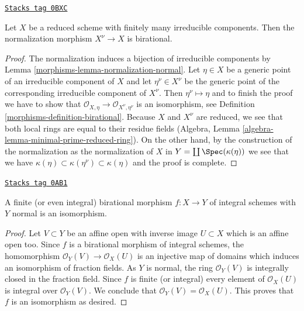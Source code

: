 \begin{lemma}
\label{morphisms-lemma-normalization-birational}
\href{https://stacks.math.columbia.edu/tag/0BXC}{\texttt{Stacks tag 0BXC}}

Let $X$ be a reduced scheme with finitely many irreducible components.
Then the normalization morphism $X^\nu \to X$ is birational.
\end{lemma}

\begin{proof}

The normalization induces a bijection of irreducible components by
Lemma \ref{morphisms-lemma-normalization-normal}. Let $\eta \in X$ be a generic
point of an irreducible component of $X$ and let $\eta^\nu \in X^\nu$
be the generic point of the corresponding irreducible component of $X^\nu$.
Then $\eta^\nu \mapsto \eta$ and to finish the proof we have to show that
$\mathcal{O}_{X, \eta} \to \mathcal{O}_{X^\nu, \eta^\nu}$
is an isomorphism, see Definition \ref{morphisms-definition-birational}.
Because $X$ and $X^\nu$ are reduced, we see that both local rings
are equal to their residue fields
(Algebra, Lemma \ref{algebra-lemma-minimal-prime-reduced-ring}).
On the other hand, by the construction of the normalization
as the normalization of $X$ in $Y = \coprod \Spec(\kappa(\eta))$
we see that we have
$\kappa(\eta) \subset \kappa(\eta^\nu) \subset \kappa(\eta)$
and the proof is complete.
\end{proof}

\begin{lemma}
\label{morphisms-lemma-finite-birational-over-normal}
\href{https://stacks.math.columbia.edu/tag/0AB1}{\texttt{Stacks tag 0AB1}}

A finite (or even integral) birational morphism $f : X \to Y$
of integral schemes with $Y$ normal is an isomorphism.
\end{lemma}

\begin{proof}
Let $V \subset Y$ be an affine open
with inverse image $U \subset X$ which is an affine open too.
Since $f$ is a birational morphism of integral schemes, the homomorphism
$\mathcal{O}_Y(V) \to \mathcal{O}_X(U)$ is an injective map of domains
which induces an isomorphism of fraction fields. As $Y$ is normal,
the ring $\mathcal{O}_Y(V)$ is integrally closed in the fraction field.
Since $f$ is finite (or integral) every element of $\mathcal{O}_X(U)$
is integral over $\mathcal{O}_Y(V)$. We conclude that
$\mathcal{O}_Y(V) = \mathcal{O}_X(U)$. This proves that $f$ is an
isomorphism as desired.
\end{proof}

